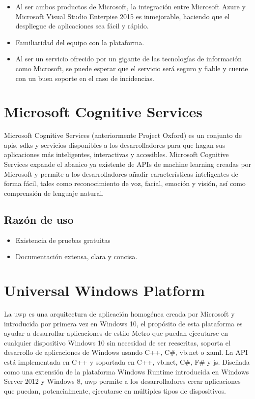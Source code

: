 \begin{itemize}
	\item Al ser ambos productos de Microsoft, la integración entre Microsoft Azure y Microsoft Visual Studio Enterpise 2015 es inmejorable, haciendo que el despliegue de aplicaciones sea fácil y rápido.
	\item Familiaridad del equipo con la plataforma.
	\item Al ser un servicio ofrecido por un gigante de las tecnologías de información como Microsoft, se puede esperar que el servicio será seguro y fiable y cuente con un buen soporte en el caso de incidencias.

\end{itemize}

\section{Microsoft Cognitive Services}

Microsoft Cognitive Services\cite{Oxford} (anteriormente Project Oxford) es un conjunto de \acrshort{api}s, \acrshort{sdk}s y servicios disponibles a los desarrolladores para que hagan sus aplicaciones más inteligentes, interactivas y accesibles. Microsoft Cognitive Services expande el abanico ya existente de APIs de machine learning creadas por Microsoft y permite a los desarrolladores añadir características inteligentes de forma fácil, tales como reconocimiento de voz, facial, emoción y visión, así como comprensión de lenguaje natural.

\subsection{Razón de uso}

\begin{itemize}
	\item Existencia de pruebas gratuitas
	\item Documentación extensa, clara y concisa.

\end{itemize}

\section{Universal Windows Platform}

La \acrfull{uwp}\cite{UWP} es una arquitectura de aplicación homogénea creada por Microsoft y introducida por primera vez en Windows 10, el propósito de esta plataforma es ayudar a desarrollar aplicaciones de estilo Metro que puedan ejecutarse en cualquier dispositivo Windows 10 sin necesidad de ser reescritas, soporta el desarrollo de aplicaciones de Windows usando C++, C\#, \acrshort{vb.net} o \acrshort{xaml}. La API está implementada en C++ y soportada en C++, \acrshort{vb.net}, C\#, F\# y \acrfull{js}. Diseñada como una extensión de la plataforma Windows Runtime introducida en Windows Server 2012 y Windows 8, \acrshort{uwp} permite a los desarrolladores crear aplicaciones que puedan, potencialmente, ejecutarse en múltiples tipos de dispositivos.

